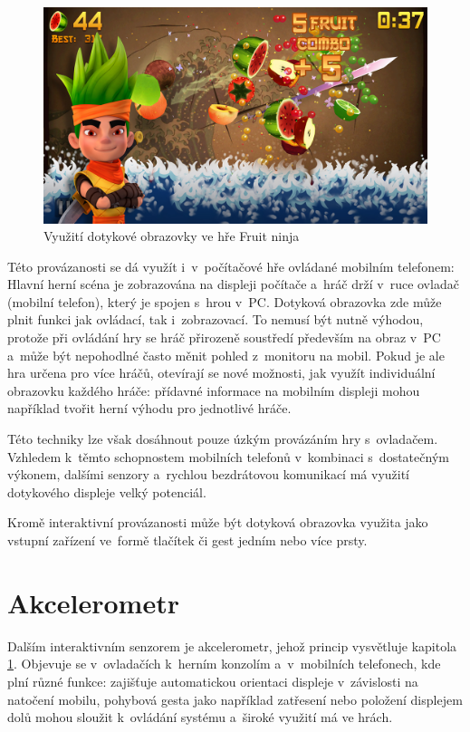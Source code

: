 \documentclass[thesis=B,czech,hidelinks]{FITthesis}[2012/06/26] %
\begin{document}
\begin{figure}
\includegraphics[width=\textwidth]{fruit_ninja}
\caption{Využití dotykové obrazovky ve hře Fruit ninja\cite{fruitninja}}
\end{figure}

Této provázanosti se dá využít i~v~počítačové hře ovládané mobilním telefonem: Hlavní herní scéna je zobrazována na displeji počítače a~hráč drží v~ruce ovladač (mobilní telefon), který je spojen s~hrou v~PC. Dotyková obrazovka zde může plnit funkci jak ovládací, tak i~zobrazovací. To nemusí být nutně výhodou, protože při ovládání hry se hráč přirozeně soustředí především na obraz v~PC a~může být nepohodlné často měnit pohled z~monitoru na mobil. Pokud je ale hra určena pro více hráčů, otevírají se nové možnosti, jak využít individuální obrazovku každého hráče: přídavné informace na mobilním displeji mohou například tvořit herní výhodu pro jednotlivé hráče.

Této techniky lze však dosáhnout pouze úzkým provázáním hry s~ovladačem. Vzhledem k~těmto schopnostem mobilních telefonů v~kombinaci s~dostatečným výkonem, dalšími senzory a~rychlou bezdrátovou komunikací má využití dotykového displeje velký potenciál.

Kromě interaktivní provázanosti může být dotyková obrazovka využita jako vstupní zařízení ve~formě tlačítek či gest jedním nebo více prsty.

\section{Akcelerometr}
\label{section:accelerometer}

Dalším interaktivním senzorem je akcelerometr, jehož princip vysvětluje kapitola \ref{section:accelerometer}. Objevuje se v~ovladačích k~herním konzolím a~v~mobilních telefonech, kde plní různé funkce: zajišťuje automatickou orientaci displeje v~závislosti na natočení mobilu, pohybová gesta jako například zatřesení nebo položení displejem dolů mohou sloužit k~ovládání systému a~široké využití má ve hrách.
\end{document}
